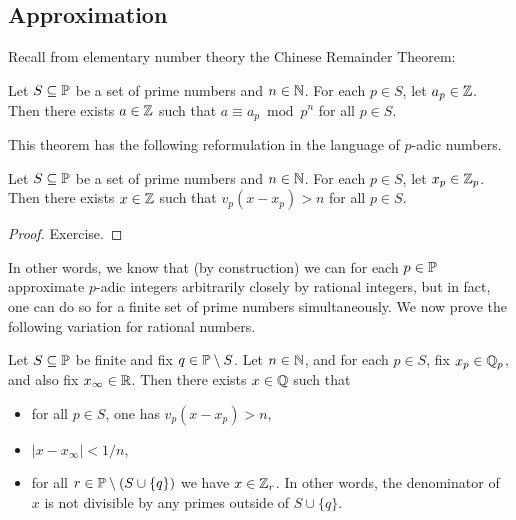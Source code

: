 \documentclass[12pt, leqno, british]{amsart}
\begin{document}
\subsection{Approximation}
Recall from elementary number theory the Chinese Remainder Theorem:
\begin{thm}\label{T:CRT}
Let $S \subseteq \mathbb P$ be a set of prime numbers and $n \in \mathbb N$.
For each $p \in S$, let $a_p \in \mathbb Z$.
Then there exists $a \in \mathbb Z$ such that $a \equiv a_p \bmod p^n$ for all $p \in S$.
\end{thm}
This theorem has the following reformulation in the language of $p$-adic numbers.
\begin{cor}\label{C:CRT}
Let $S \subseteq \mathbb P$ be a set of prime numbers and $n \in \mathbb N$.
For each $p \in S$, let $x_p \in \mathbb Z_p$.
Then there exists $x \in \mathbb Z$ such that $v_p(x - x_p) > n$ for all $p \in S$.
\end{cor}
\begin{proof}
Exercise.
\end{proof}
In other words, we know that (by construction) we can for each $p \in \mathbb P$ approximate $p$-adic integers arbitrarily closely by rational integers, but in fact, one can do so for a finite set of prime numbers simultaneously.
We now prove the following variation for rational numbers.
\begin{thm}\label{T:WAT}
Let $S \subseteq \mathbb P$ be finite and fix $q \in \mathbb P \setminus S$.
Let $n \in \mathbb N$, and for each $p \in S$, fix $x_p \in \mathbb Q_p$, and also fix $x_\infty \in \mathbb R$.
Then there exists $x \in \mathbb Q$ such that
\begin{itemize}
\item for all $p \in S$, one has $v_p(x - x_p) > n$,
\item $\lvert x - x_\infty \rvert < 1/n$,
\item for all $r \in \mathbb P \setminus (S \cup \lbrace q \rbrace)$ we have $x \in \mathbb Z_r$.
In other words, the denominator of $x$ is not divisible by any primes outside of $S \cup \lbrace q \rbrace$.
\end{itemize} 
\end{thm}
\end{document}
